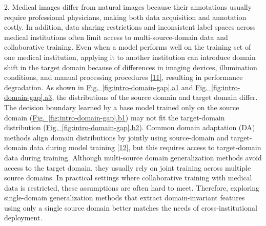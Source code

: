 2. Medical images differ from natural images because their annotations usually require professional physicians, making both data acquisition and annotation costly. In addition, data sharing restrictions and inconsistent label spaces across medical institutions often limit access to multi-source-domain data and collaborative training. Even when a model performs well on the training set of one medical institution, applying it to another institution can introduce domain shift in the target domain because of differences in imaging devices, illumination conditions, and manual processing procedures \hyperref[_Ref213949348]{{[}11{]}}, resulting in performance degradation. As shown in \hyperref[fig:intro-domain-gap]{Fig.~\ref*{fig:intro-domain-gap}.a1} and \hyperref[fig:intro-domain-gap]{Fig.~\ref*{fig:intro-domain-gap}.a3}, the distributions of the source domain and target domain differ. The decision boundary learned by a base model trained only on the source domain (\hyperref[fig:intro-domain-gap]{Fig.~\ref*{fig:intro-domain-gap}.b1}) may not fit the target-domain distribution (\hyperref[fig:intro-domain-gap]{Fig.~\ref*{fig:intro-domain-gap}.b2}). Common domain adaptation (DA) methods align domain distributions by jointly using source-domain and target-domain data during model training \hyperref[_Ref213949354]{{[}12{]}}, but this requires access to target-domain data during training. Although multi-source domain generalization methods avoid access to the target domain, they usually rely on joint training across multiple source domains. In practical settings where collaborative training with medical data is restricted, these assumptions are often hard to meet. Therefore, exploring single-domain generalization methods that extract domain-invariant features using only a single source domain better matches the needs of cross-institutional deployment.

